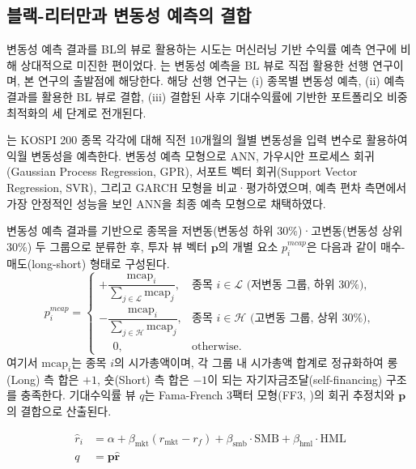 \documentclass{article}
\begin{document}
\subsection{블랙-리터만과 변동성 예측의 결합}
\label{subsec:bl_vol_review}

변동성 예측 결과를 BL의 뷰로 활용하는 시도는 머신러닝 기반 수익률 예측 연구에 비해 상대적으로 미진한 편이었다. \citet{pyo2018}는 변동성 예측을 BL 뷰로 직접 활용한 선행 연구이며, 본 연구의 출발점에 해당한다. 해당 선행 연구는 (i) 종목별 변동성 예측, (ii) 예측 결과를 활용한 BL 뷰로 결합, (iii) 결합된 사후 기대수익률에 기반한 포트폴리오 비중 최적화의 세 단계로 전개된다.

\citet{pyo2018}는 KOSPI 200 종목 각각에 대해 직전 10개월의 월별 변동성을 입력 변수로 활용하여 익월 변동성을 예측한다. 변동성 예측 모형으로 ANN, 가우시안 프로세스 회귀(Gaussian Process Regression, GPR), 서포트 벡터 회귀(Support Vector Regression, SVR), 그리고 GARCH 모형을 비교·평가하였으며, 예측 편차 측면에서 가장 안정적인 성능을 보인 ANN을 최종 예측 모형으로 채택하였다.

변동성 예측 결과를 기반으로 종목을 저변동(변동성 하위 30\%)·고변동(변동성 상위 30\%) 두 그룹으로 분류한 후, 투자 뷰 벡터 $\mathbf{p}$의 개별 요소  $p_i^{mcap}$은 다음과 같이 매수-매도(long-short) 형태로 구성된다.
\begin{equation}
    p_i^{mcap} = \begin{cases}
    +\dfrac{\mathrm{mcap}_i}{\sum_{j \in \mathcal{L}} \mathrm{mcap}_j},  & \text{종목 } i \in \mathcal{L} \text{ (저변동 그룹, 하위 30\%)} ,\\[8pt]
    -\dfrac{\mathrm{mcap}_i}{\sum_{j \in \mathcal{H}} \mathrm{mcap}_j}, & \text{종목 } i \in \mathcal{H} \text{ (고변동 그룹, 상위 30\%)}, \\[6pt]
    \phantom{+}0,                & \text{otherwise}.
\end{cases}
    \label{eq:pyo_p}
\end{equation}
여기서 $\mathrm{mcap}_i$는 종목 $i$의 시가총액이며, 각 그룹 내 시가총액 합계로 정규화하여 롱(Long) 측 합은 $+1$, 숏(Short) 측 합은 $-1$이 되는 자기자금조달(self-financing) 구조를 충족한다. 기대수익률 뷰 $q$는 Fama-French 3팩터 모형(FF3, \citep{fama1993common})의 회귀 추정치와 $\mathbf{p}$의 결합으로 산출된다.

\begin{align}
\hat{r}_i &= \alpha + \beta_{\text{mkt}}(r_{\text{mkt}} - r_f)
           + \beta_{\text{smb}} \cdot \text{SMB}
           + \beta_{\text{hml}} \cdot \text{HML} \label{eq:pyo_ff3}\\
q &= \mathbf{p} \hat{\mathbf{r}} \label{eq:pyo_q}
\end{align}
\end{document}
